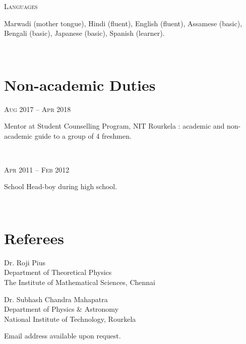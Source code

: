 \documentclass[11pt, letterpaper]{article}
\newcommand{\entry}[4]{
	\ifthenelse{\isempty{#3}}
	{\slimentry{#1}{#2}}{
	\begin{minipage}[t]{.25\linewidth}
		\hfill \textsc{#1}
	\end{minipage}
	\hfill\vline\hfill
	\begin{minipage}[t]{.7\linewidth}
		{\bf#2} \\ \textsf{#3} \\ \footnotesize{#4}
	\end{minipage}\\
	\vspace{.2cm}
}}
\newcommand{\slimentry}[2]{
	\begin{minipage}[t]{.25\linewidth}
	\hfill \textsc{#1}
	\end{minipage}
	\hfill\vline\hfill
	\begin{minipage}[t]{.7\linewidth}
	#2
	\end{minipage}\\
	\vspace{.25cm}
}%
\newcommand{\nitr}{National Institute of Technology, Rourkela}
\newcommand{\imsc}{The Institute of Mathematical Sciences, Chennai}
\begin{document}
	\slimentry{Languages}{Marwadi (mother tongue), Hindi (fluent), English (fluent), Assamese (basic), Bengali (basic), Japanese (basic), Spanish (learner).}
	
	\section{Non-academic Duties}
	\slimentry{Aug 2017 -- Apr 2018}{Mentor at Student Counselling Program, NIT Rourkela : academic and non-academic guide to a group of 4 freshmen.}

	\slimentry{Apr 2011 -- Feb 2012}{School Head-boy during high school.}

	\vspace{-15pt} 
	\section{Referees}
	\vspace{-15pt} 
	\begin{multicols}{2}
			Dr. Roji Pius \\
			Department of Theoretical Physics \\
			\imsc 

			\vfill

			Dr. Subhash Chandra Mahapatra \\
			Department of Physics \& Astronomy \\
			\nitr 
	\end{multicols}
	Email address available upon request.
\end{document}

